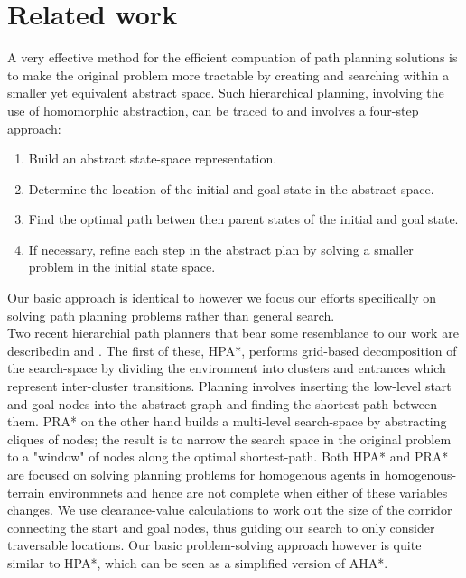 \documentclass[letterpaper]{article}
\begin{document}
\section{Related work}
A very effective method for the efficient compuation of path planning solutions is to make the original problem more tractable by creating and searching within a smaller yet equivalent abstract space. Such hierarchical planning, involving the use of homomorphic abstraction, can be traced to \cite{holte96} and involves a four-step approach:
\begin{enumerate}
\item{Build an abstract state-space representation.}
\item{Determine the location of the initial and goal state in the abstract space.}
\item{Find the optimal path betwen then parent states of the initial and goal state. }
\item{If necessary, refine each step in the abstract plan by solving a smaller problem in the initial state space.}
\end{enumerate}
Our basic approach is identical to \cite{holte96} however we focus our efforts specifically on solving path planning problems rather than general search. \\ \newline 
Two recent hierarchial path planners that bear some resemblance to our work are describedin \cite{botea04} and \cite{sturtevant05}. The first of these, HPA*, performs grid-based decomposition of the search-space by dividing the environment into clusters and entrances which represent inter-cluster transitions. Planning involves inserting the low-level start and goal nodes into the abstract graph and finding the shortest path between them. 
PRA* on the other hand builds a multi-level search-space by abstracting cliques of nodes; the result is to narrow the search space in the original problem to a "window" of nodes along the optimal shortest-path.\newline
Both HPA* and PRA* are focused on solving planning problems for homogenous agents in homogenous-terrain environmnets and hence are not complete when either of these variables changes. We use clearance-value calculations to work out the size of the corridor connecting the start and goal nodes, thus guiding our search to only consider traversable locations. Our basic problem-solving approach however is quite similar to HPA*, which can be seen as a simplified version of AHA*. \\ \newline
\end{document}
